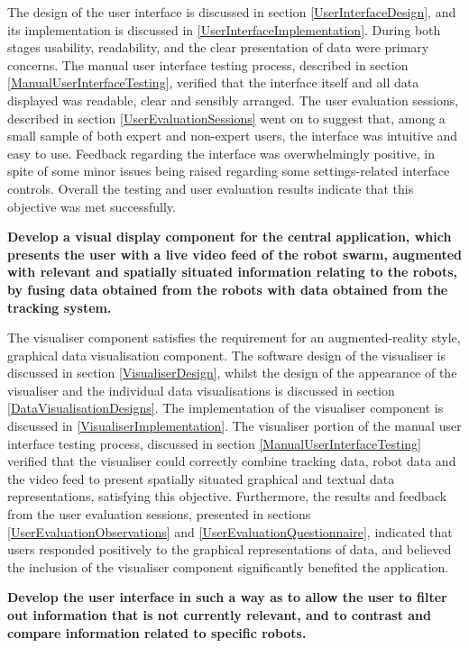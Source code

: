 The design of the user interface is discussed in section \ref{UserInterfaceDesign}, and its implementation is discussed in \ref{UserInterfaceImplementation}. During both stages usability, readability, and the clear presentation of data were primary concerns. The manual user interface testing process, described in section \ref{ManualUserInterfaceTesting}, verified that the interface itself and all data displayed was readable, clear and sensibly arranged. The user evaluation sessions, described in section \ref{UserEvaluationSessions} went on to suggest that, among a small sample of both expert and non-expert users, the interface was intuitive and easy to use. Feedback regarding the interface was overwhelmingly positive, in spite of some minor issues being raised regarding some settings-related interface controls. Overall the testing and user evaluation results indicate that this objective was met successfully.

\noindent \textbf{Develop a visual display component for the central application, which presents the user with a live video feed of the robot swarm, augmented with relevant and spatially situated information relating to the robots, by fusing data obtained from the robots with data obtained from the tracking system.}

The visualiser component satisfies the requirement for an augmented-reality style, graphical data visualisation component. The software design of the visualiser is discussed in section \ref{VisualiserDesign}, whilst the design of the appearance of the visualiser and the individual data visualisations is discussed in section \ref{DataVisualisationDesigns}. The implementation of the visualiser component is discussed in \ref{VisualiserImplementation}. The visualiser portion of the manual user interface testing process, discussed in section \ref{ManualUserInterfaceTesting} verified that the visualiser could correctly combine tracking data, robot data and the video feed to present spatially situated graphical and textual data representations, satisfying this objective. Furthermore, the results and feedback from the user evaluation sessions, presented in sections \ref{UserEvaluationObservations} and \ref{UserEvaluationQuestionnaire}, indicated that users responded positively to the graphical representations of data, and believed the inclusion of the visualiser component significantly benefited the application.

\noindent \textbf{Develop the user interface in such a way as to allow the user to filter out information that is not currently relevant, and to contrast and compare information related to specific robots.}

